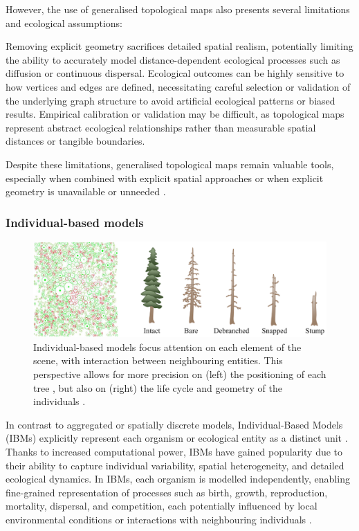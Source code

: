 However, the use of generalised topological maps also presents several limitations and ecological assumptions:
\begin{Itemize}
\Item{} Removing explicit geometry sacrifices detailed spatial realism, potentially limiting the ability to accurately model distance-dependent ecological processes such as diffusion or continuous dispersal.
\Item{} Ecological outcomes can be highly sensitive to how vertices and edges are defined, necessitating careful selection or validation of the underlying graph structure to avoid artificial ecological patterns or biased results.
\Item{} Empirical calibration or validation may be difficult, as topological maps represent abstract ecological relationships rather than measurable spatial distances or tangible boundaries.
\end{Itemize}

Despite these limitations, generalised topological maps remain valuable tools, especially when combined with explicit spatial approaches \cite{Ecormier-Nocca2021} or when explicit geometry is unavailable or unneeded \cite{Duflot2018,Boussange2022}.

\subsubsection{Individual-based models}

\begin{figure}[H]
\centering
\includegraphics[]{individual-based-modeling-teaser.png}
\caption{Individual-based models focus attention on each element of the scene, with interaction between neighbouring entities. This perspective allows for more precision on (left) the positioning of each tree \cite{Alsweis2006}, but also on (right) the life cycle and geometry of the individuals \cite{Peytavie2024a}.}
\label{fig:env-obj-individual-based-models}
\end{figure}

In contrast to aggregated or spatially discrete models, Individual-Based Models (IBMs) explicitly represent each organism or ecological entity as a distinct unit \cite{Crooks2017}. Thanks to increased computational power, IBMs have gained popularity due to their ability to capture individual variability, spatial heterogeneity, and detailed ecological dynamics. In IBMs, each organism is modelled independently, enabling fine-grained representation of processes such as birth, growth, reproduction, mortality, dispersal, and competition, each potentially influenced by local environmental conditions or interactions with neighbouring individuals \cite{Chng2013,Peytavie2024a}.

